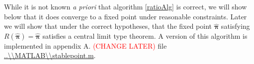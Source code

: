 While it is not known \textit{a priori} that algorithm \ref{ratioAlg} is correct, we will show below that it does converge to a fixed point under reasonable constraints.  Later we will show that under the correct hypotheses, that the fixed point $\hat{\bm\pi}$ satisfying $R(\hat{\bm\pi})=\hat{\bm\pi}$ satisfies a central limit type theorem.  A version of this algorithm is implemented in appendix A. \textcolor{red}{(CHANGE LATER)} file \url{..\\MATLAB\\stablepoint.m}.
